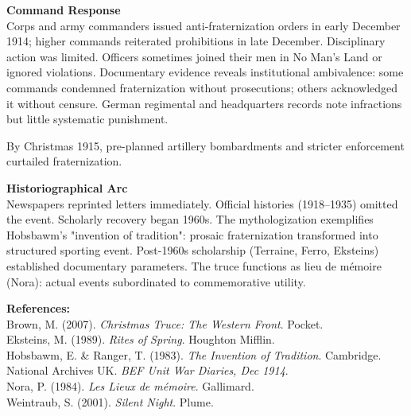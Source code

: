 \begin{technical}
\noindent\textbf{Command Response}\\[0.5em]
Corps and army commanders issued anti-fraternization orders in early December 1914; higher commands reiterated prohibitions in late December. Disciplinary action was limited. Officers sometimes joined their men in No Man's Land or ignored violations. Documentary evidence reveals institutional ambivalence: some commands condemned fraternization without prosecutions; others acknowledged it without censure. German regimental and headquarters records note infractions but little systematic punishment.

By Christmas 1915, pre-planned artillery bombardments and stricter enforcement curtailed fraternization. 

\noindent\textbf{Historiographical Arc}\\[0.5em]
Newspapers reprinted letters immediately. Official histories (1918–1935) omitted the event. Scholarly recovery began 1960s. The mythologization exemplifies Hobsbawm's "invention of tradition": prosaic fraternization transformed into structured sporting event. Post-1960s scholarship (Terraine, Ferro, Eksteins) established documentary parameters. The truce functions as lieu de mémoire (Nora): actual events subordinated to commemorative utility.

\vspace{0.5em}
\noindent\textbf{References:}\\
{\footnotesize
Brown, M. (2007). \textit{Christmas Truce: The Western Front}. Pocket.\\
Eksteins, M. (1989). \textit{Rites of Spring}. Houghton Mifflin.\\
Hobsbawm, E. \& Ranger, T. (1983). \textit{The Invention of Tradition}. Cambridge.\\
National Archives UK. \textit{BEF Unit War Diaries, Dec 1914}.\\
Nora, P. (1984). \textit{Les Lieux de mémoire}. Gallimard.\\
Weintraub, S. (2001). \textit{Silent Night}. Plume.
}
\end{technical}
